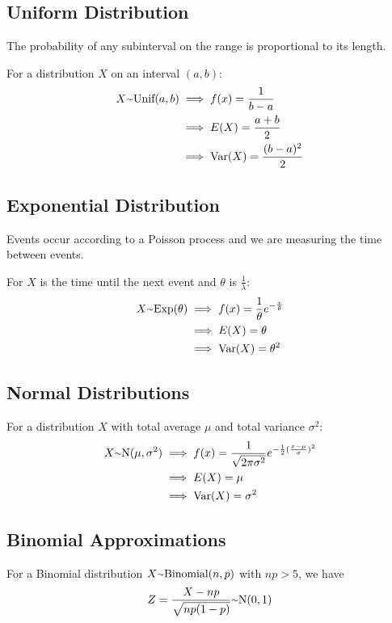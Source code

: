 \documentclass[12pt]{article}
\begin{document}
\subsection*{Uniform Distribution}
The probability of any subinterval on the range is proportional to its length.

For a distribution $X$ on an interval $(a, b)$:
\begin{align*}
X \ttilde \text{Unif}(a,b) &\implies f(x) = \frac{1}{b-a}\\
                           &\implies E(X) = \frac{a+b}{2}\\
                           &\implies \text{Var}(X) = \frac{(b-a)^2}{2}
\end{align*}

\subsection*{Exponential Distribution}
Events occur according to a Poisson process and we are measuring the time between events.

For $X$ is the time until the next event and $\theta$ is $\frac{1}{\lambda}$:
\begin{align*}
X \ttilde \text{Exp}(\theta) &\implies f(x) = \frac{1}{\theta} e^{-\frac{x}{\theta}}\\
                             &\implies E(X) = \theta\\
                             &\implies \text{Var}(X) = \theta^2
\end{align*}

\subsection*{Normal Distributions}
For a distribution $X$ with total average $\mu$ and total variance $\sigma^2$:
\begin{align*}
X \ttilde \text{N}(\mu, \sigma^2) &\implies f(x) = \frac{1}{\sqrt{2\pi\sigma^2}} e^{-\frac{1}{2} (\frac{x-\mu}{\sigma})^2}\\
                                  &\implies E(X) = \mu\\
                                  &\implies \text{Var}(X) = \sigma^2
\end{align*}

\subsection*{Binomial Approximations}
For a Binomial distribution $X \ttilde \text{Binomial}(n,p)$ with $np > 5$, we have \[ Z = \frac{X - np}{\sqrt{np(1-p)}} \ttilde \text{N}(0,1) \]
\end{document}
